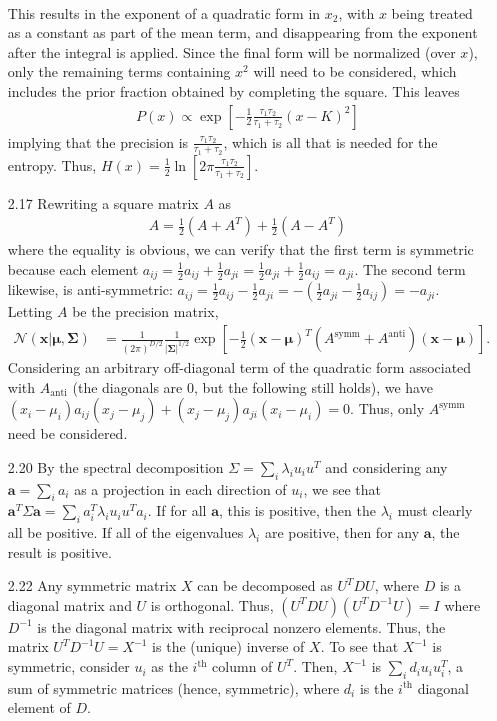 \documentclass[]{article}
\begin{document}
\begin{enumerate}
\begin{align*}
	\end{align*}
	This results in the exponent of a quadratic form in $x_2$, with $x$ being treated as a constant as part of the mean term, and disappearing from the exponent after the integral is applied. Since the final form will be normalized (over $x$), only the remaining terms containing $x^2$ will need to be considered, which includes the prior fraction obtained by completing the square. This leaves 
	\begin{align}
	P(x) \propto \exp \left[ -\frac{1}{2} \frac{\tau_1\tau_2}{\tau_1 + \tau_2}(x - K)^2 \right]
	\end{align}
	implying that the precision is $\frac{\tau_1 \tau_2}{\tau_1 + \tau_2}$, which is all that is needed for the entropy. Thus, $H(x)=\frac{1}{2}\ln \left[ 2\pi \frac{\tau_1 \tau_2}{\tau_1 + \tau_2} \right]$.
	\item[2.17] Rewriting a square matrix $A$ as 
	\begin{align*}
	A = \frac{1}{2}(A + A^T) + \frac{1}{2}(A - A^T)
	\end{align*}
	where the equality is obvious, we can verify that the first term is symmetric because each element $a_{ij}=\frac{1}{2}a_{ij} + \frac{1}{2}a_{ji}=\frac{1}{2}a_{ji} + \frac{1}{2}a_{ij}=a_{ji}$. The second term likewise, is anti-symmetric: $a_{ij}=\frac{1}{2}a_{ij} - \frac{1}{2}a_{ji}=-(\frac{1}{2}a_{ji} - \frac{1}{2}a_{ij})=-a_{ji}$. Letting $A$ be the precision matrix, 
	\begin{align*}
	\mathcal{N}(\mathbf{x}|\bm{\mu}, \bm{\Sigma}) &= \frac{1}{(2 \pi)^{D/2}}\frac{1}{|\bm{\Sigma}|^{1/2}} \exp \left[ -\frac{1}{2}(\mathbf{x}-\bm{\mu})^T\left( A^{\text{symm}} + A^{\text{anti}}\right)(\mathbf{x}-\bm{\mu}) \right].
	\end{align*}
	Considering an arbitrary off-diagonal term of the quadratic form associated with $A_\text{anti}$ (the diagonals are 0, but the following still holds), we have $(x_i-\mu_i)a_{ij}(x_j-\mu_j) + (x_j-\mu_j)a_{ji}(x_i-\mu_i)=0$. Thus, only $A^\text{symm}$ need be considered.
	\item[2.20] By the spectral decomposition $\Sigma = \sum_{i}\lambda_i u_i u^T$ and considering any $\mathbf{a}=\sum_{i}a_i$ as a projection in each direction of $u_i$, we see that $\mathbf{a}^T\Sigma \mathbf{a}= \sum_{i} a_i^T\lambda_i u_i u^Ta_i$. If for all $\mathbf{a}$, this is positive, then the $\lambda_i$ must clearly all be positive. If all of the eigenvalues $\lambda_i$ are positive, then for any $\mathbf{a}$, the result is positive.
	\item[2.22] Any symmetric matrix $X$ can be decomposed as $U^TDU$, where $D$ is a diagonal matrix and $U$ is orthogonal. Thus, $(U^TDU)(U^TD^{-1}U)=I$ where $D^{-1}$ is the diagonal matrix with reciprocal nonzero elements. Thus, the matrix $U^TD^{-1}U=X^{-1}$ is the (unique) inverse of $X$. To see that $X^{-1}$ is symmetric, consider $u_i$ as the $i^{\text{th}}$ column of $U^T$. Then, $X^{-1}$ is $\sum_{i}d_i u_i u_i^T$, a sum of symmetric matrices (hence, symmetric), where $d_i$ is the $i^\text{th}$ diagonal element of $D$.

\end{enumerate}
\end{document}
